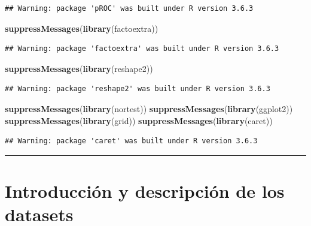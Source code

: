 \documentclass[
]{article}
\newenvironment{Shaded}{\begin{snugshade}}{\end{snugshade}}
\newcommand{\KeywordTok}[1]{\textcolor[rgb]{0.13,0.29,0.53}{\textbf{#1}}}
\newcommand{\NormalTok}[1]{#1}
\begin{document}
\begin{verbatim}
## Warning: package 'pROC' was built under R version 3.6.3
\end{verbatim}

\begin{Shaded}
\begin{Highlighting}[]
\KeywordTok{suppressMessages}\NormalTok{(}\KeywordTok{library}\NormalTok{(factoextra))}
\end{Highlighting}
\end{Shaded}

\begin{verbatim}
## Warning: package 'factoextra' was built under R version 3.6.3
\end{verbatim}

\begin{Shaded}
\begin{Highlighting}[]
\KeywordTok{suppressMessages}\NormalTok{(}\KeywordTok{library}\NormalTok{(reshape2))}
\end{Highlighting}
\end{Shaded}

\begin{verbatim}
## Warning: package 'reshape2' was built under R version 3.6.3
\end{verbatim}

\begin{Shaded}
\begin{Highlighting}[]
\KeywordTok{suppressMessages}\NormalTok{(}\KeywordTok{library}\NormalTok{(nortest))}
\KeywordTok{suppressMessages}\NormalTok{(}\KeywordTok{library}\NormalTok{(ggplot2))}
\KeywordTok{suppressMessages}\NormalTok{(}\KeywordTok{library}\NormalTok{(grid))}
\KeywordTok{suppressMessages}\NormalTok{(}\KeywordTok{library}\NormalTok{(caret))}
\end{Highlighting}
\end{Shaded}

\begin{verbatim}
## Warning: package 'caret' was built under R version 3.6.3
\end{verbatim}

\begin{center}\rule{0.5\linewidth}{0.5pt}\end{center}

\newpage

\hypertarget{introducciuxf3n-y-descripciuxf3n-de-los-datasets}{%
\section{Introducción y descripción de los
datasets}\label{introducciuxf3n-y-descripciuxf3n-de-los-datasets}}
\end{document}
